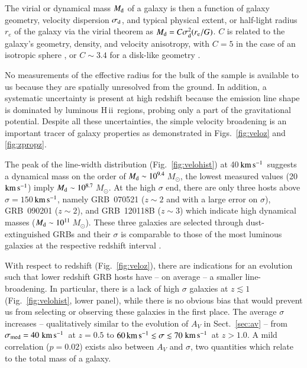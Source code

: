 \documentclass[traditabstract, longauth]{aa}
\newcommand{\kms}{$\rm{km\,s^{-1}}$}
\newcommand{\hii}{\mbox{H\,{\sc ii}}}
\newcommand{\Msun}{$M_\odot$}
\begin{document}
The virial or dynamical mass $M_{\rm{d}}$ of a galaxy is then a function of galaxy geometry, velocity dispersion $\sigma_{\rm{d}}$, and typical physical extent, or half-light radius $r_{e}$ of the galaxy via the virial theorem \citep[see, e.g.,][]{2001ApJ...554..981P} as $M_{\rm{d}} = C\sigma_{\rm{d}}^2(r_{\rm{e}}/G)$. $C$ is related to the galaxy's geometry, density, and velocity anisotropy, with $C=5$ in the case of an isotropic sphere \citep{2001ApJ...554..981P}, or $C\sim3.4$ for a disk-like geometry \citep{2006ApJ...646..107E}.

No measurements of the effective radius for the bulk of the sample is available to us because they are spatially unresolved from the ground.  {In addition, a systematic uncertainty is present at high redshift because the emission line shape is dominated by luminous \hii\, regions, probing only a part of the gravitational potential. Despite all these uncertainties, the simple velocity broadening is an important tracer of galaxy properties as demonstrated in Figs.~\ref{fig:veloz} and \ref{fig:zpropz}.} 

The peak of the line-width distribution (Fig.~\ref{fig:velohist}) at 40\,\kms\, suggests a dynamical mass on the order of $M_{\rm{d}} \sim 10^{9.4}$\,\Msun, the lowest measured values (20\,\kms) imply $M_{\rm{d}} \sim 10^{8.7}$\,\Msun. At the high $\sigma$ end, there are only three hosts above $\sigma=150$\,\kms, namely GRB~070521 ($z\sim2$ and with a large error on $\sigma$), GRB~090201 ($z\sim2$), and GRB~120118B ($z\sim3$) which indicate high dynamical masses ($M_{\rm{d}} \sim 10^{11}$\,\Msun). These three galaxies are selected through dust-extinguished GRBs and their $\sigma$ is comparable to those of the most luminous galaxies at the respective redshift interval \citep[e.g.,][]{2006ApJ...646..107E}.

With respect to redshift (Fig.~\ref{fig:veloz}), there are indications for an evolution such that lower redshift GRB hosts have -- on average -- a smaller line-broadening. In particular, there is a lack of high $\sigma$ galaxies at $z\lesssim1$ (Fig.~\ref{fig:velohist}, lower panel), while there is no obvious bias that would prevent us from selecting or observing these galaxies in the first place. The average $\sigma$ increases -- qualitatively similar to the evolution of $A_V$ in Sect.~\ref{sec:av} -- from $\sigma_{\rm{med}}=40\,$\kms\, at $z=0.5$ to $60\,\rm{km\,s^{-1}}\lesssim \sigma \lesssim 70\,$\kms\, at $z>1.0$. A mild correlation ($p=0.02$) exists also between $A_V$ and $\sigma$, two quantities which relate to the total mass of a galaxy.
 
\end{document}
